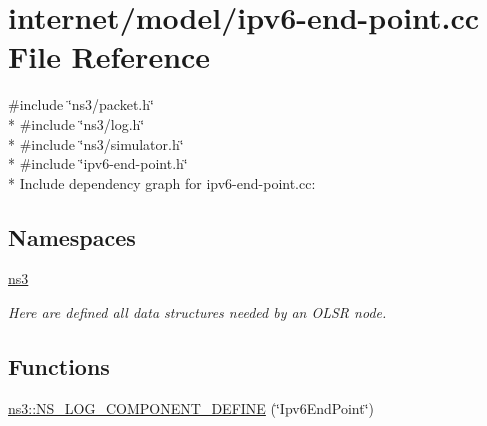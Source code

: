 \hypertarget{ipv6-end-point_8cc}{}\section{internet/model/ipv6-\/end-\/point.cc File Reference}
\label{ipv6-end-point_8cc}
{\ttfamily \#include \char`\"{}ns3/packet.\+h\char`\"{}}\\*
{\ttfamily \#include \char`\"{}ns3/log.\+h\char`\"{}}\\*
{\ttfamily \#include \char`\"{}ns3/simulator.\+h\char`\"{}}\\*
{\ttfamily \#include \char`\"{}ipv6-\/end-\/point.\+h\char`\"{}}\\*
Include dependency graph for ipv6-\/end-\/point.cc\+:
\subsection*{Namespaces}
\begin{DoxyCompactItemize}
\item 
 \hyperlink{namespacens3}{ns3}
\begin{DoxyCompactList}\small\item\em Here are defined all data structures needed by an O\+L\+SR node. \end{DoxyCompactList}\end{DoxyCompactItemize}
\subsection*{Functions}
\begin{DoxyCompactItemize}
\item 
\hyperlink{namespacens3_a44a8a94ba9b1771f11cec2c7ddb3d92c}{ns3\+::\+N\+S\+\_\+\+L\+O\+G\+\_\+\+C\+O\+M\+P\+O\+N\+E\+N\+T\+\_\+\+D\+E\+F\+I\+NE} (\char`\"{}Ipv6\+End\+Point\char`\"{})
\end{DoxyCompactItemize}
